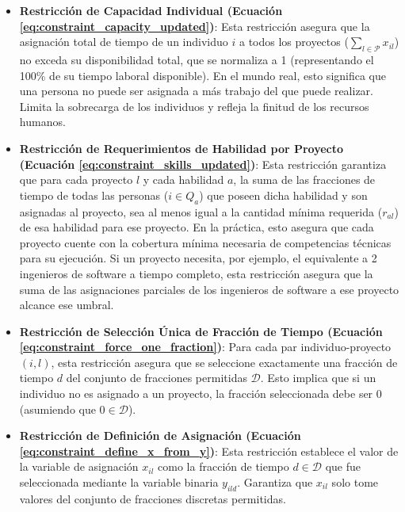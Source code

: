 \documentclass[conference]{IEEEtran}
\begin{document}
\begin{itemize}
    \item \textbf{Restricción de Capacidad Individual (Ecuación \ref{eq:constraint_capacity_updated})}: Esta restricción asegura que la asignación total de tiempo de un individuo \(i\) a todos los proyectos (\(\sum_{l \in \mathcal{P}} x_{il}\)) no exceda su disponibilidad total, que se normaliza a 1 (representando el 100\% de su tiempo laboral disponible). En el mundo real, esto significa que una persona no puede ser asignada a más trabajo del que puede realizar. Limita la sobrecarga de los individuos y refleja la finitud de los recursos humanos.

    \item \textbf{Restricción de Requerimientos de Habilidad por Proyecto (Ecuación \ref{eq:constraint_skills_updated})}: Esta restricción garantiza que para cada proyecto \(l\) y cada habilidad \(a\), la suma de las fracciones de tiempo de todas las personas (\(i \in Q_a\)) que poseen dicha habilidad y son asignadas al proyecto, sea al menos igual a la cantidad mínima requerida (\(r_{al}\)) de esa habilidad para ese proyecto. En la práctica, esto asegura que cada proyecto cuente con la cobertura mínima necesaria de competencias técnicas para su ejecución. Si un proyecto necesita, por ejemplo, el equivalente a 2 ingenieros de software a tiempo completo, esta restricción asegura que la suma de las asignaciones parciales de los ingenieros de software a ese proyecto alcance ese umbral.

    \item \textbf{Restricción de Selección Única de Fracción de Tiempo (Ecuación \ref{eq:constraint_force_one_fraction})}: Para cada par individuo-proyecto \((i,l)\), esta restricción asegura que se seleccione exactamente una fracción de tiempo \(d\) del conjunto de fracciones permitidas \(\mathcal{D}\). Esto implica que si un individuo no es asignado a un proyecto, la fracción seleccionada debe ser 0 (asumiendo que \(0 \in \mathcal{D}\)).

    \item \textbf{Restricción de Definición de Asignación (Ecuación \ref{eq:constraint_define_x_from_y})}: Esta restricción establece el valor de la variable de asignación \(x_{il}\) como la fracción de tiempo \(d \in \mathcal{D}\) que fue seleccionada mediante la variable binaria \(y_{ild}\). Garantiza que \(x_{il}\) solo tome valores del conjunto de fracciones discretas permitidas.
\end{itemize}
\end{document}
